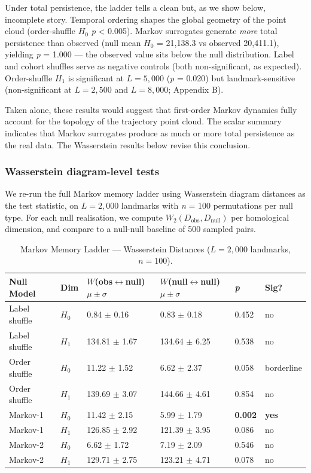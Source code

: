 Under total persistence, the ladder tells a clean but, as we show below, incomplete story. Temporal ordering shapes the global geometry of the point cloud (order-shuffle $H_0$ \textit{p} < 0.005). Markov surrogates generate \textit{more} total persistence than observed (null mean $H_0$ = 21,138.3 vs observed 20,411.1), yielding \textit{p} = 1.000 --- the observed value sits below the null distribution. Label and cohort shuffles serve as negative controls (both non-significant, as expected). Order-shuffle $H_1$ is significant at $L = 5{,}000$ (\textit{p} = 0.020) but landmark-sensitive (non-significant at $L = 2{,}500$ and $L = 8{,}000$; Appendix B).

Taken alone, these results would suggest that first-order Markov dynamics fully account for the topology of the trajectory point cloud. The scalar summary indicates that Markov surrogates produce as much or more total persistence as the real data. The Wasserstein results below revise this conclusion.

\subsubsection{Wasserstein diagram-level tests}

We re-run the full Markov memory ladder using Wasserstein diagram distances as the test statistic, on $L = 2{,}000$ landmarks with \textit{n} = 100 permutations per null type. For each null realisation, we compute $W_2(D_{\text{obs}}, D_{\text{null}})$ per homological dimension, and compare to a null-null baseline of 500 sampled pairs.

\begin{table}[htbp]
\centering
\caption{Markov Memory Ladder --- Wasserstein Distances ($L = 2{,}000$ landmarks, $n = 100$).}
\label{tab:wasserstein}
\small
\begin{tabular}{llllll}
\toprule
Null Model & Dim & $W$(obs$\leftrightarrow$null) $\mu{\pm}\sigma$ & $W$(null$\leftrightarrow$null) $\mu{\pm}\sigma$ & \textit{p} & Sig? \\
\midrule
Label shuffle & $H_0$ & 0.84 $\pm$ 0.16 & 0.83 $\pm$ 0.18 & 0.452 & no \\
Label shuffle & $H_1$ & 134.81 $\pm$ 1.67 & 134.64 $\pm$ 6.25 & 0.538 & no \\
Order shuffle & $H_0$ & 11.22 $\pm$ 1.52 & 6.62 $\pm$ 2.37 & 0.058 & borderline \\
Order shuffle & $H_1$ & 139.69 $\pm$ 3.07 & 144.66 $\pm$ 4.61 & 0.854 & no \\
Markov-1 & $H_0$ & 11.42 $\pm$ 2.15 & 5.99 $\pm$ 1.79 & \textbf{0.002} & \textbf{yes} \\
Markov-1 & $H_1$ & 126.85 $\pm$ 2.92 & 121.39 $\pm$ 3.95 & 0.086 & no \\
Markov-2 & $H_0$ & 6.62 $\pm$ 1.72 & 7.19 $\pm$ 2.09 & 0.546 & no \\
Markov-2 & $H_1$ & 129.71 $\pm$ 2.75 & 123.21 $\pm$ 4.71 & 0.078 & no \\
\bottomrule
\end{tabular}
\end{table}

